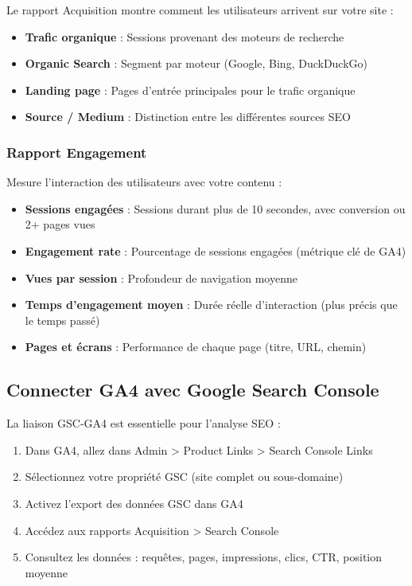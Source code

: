 \documentclass[12pt,a4paper,twoside]{report}
\begin{document}
Le rapport Acquisition montre comment les utilisateurs arrivent sur votre site :
\begin{itemize}
    \item \textbf{Trafic organique} : Sessions provenant des moteurs de recherche
    \item \textbf{Organic Search} : Segment par moteur (Google, Bing, DuckDuckGo)
    \item \textbf{Landing page} : Pages d'entrée principales pour le trafic organique
    \item \textbf{Source / Medium} : Distinction entre les différentes sources SEO
\end{itemize}

\subsubsection{Rapport Engagement}

Mesure l'interaction des utilisateurs avec votre contenu :
\begin{itemize}
    \item \textbf{Sessions engagées} : Sessions durant plus de 10 secondes, avec conversion ou 2+ pages vues
    \item \textbf{Engagement rate} : Pourcentage de sessions engagées (métrique clé de GA4)
    \item \textbf{Vues par session} : Profondeur de navigation moyenne
    \item \textbf{Temps d'engagement moyen} : Durée réelle d'interaction (plus précis que le temps passé)
    \item \textbf{Pages et écrans} : Performance de chaque page (titre, URL, chemin)
\end{itemize}

\subsection{Connecter GA4 avec Google Search Console}

La liaison GSC-GA4 est essentielle pour l'analyse SEO :

\begin{enumerate}
    \item Dans GA4, allez dans Admin > Product Links > Search Console Links
    \item Sélectionnez votre propriété GSC (site complet ou sous-domaine)
    \item Activez l'export des données GSC dans GA4
    \item Accédez aux rapports Acquisition > Search Console
    \item Consultez les données : requêtes, pages, impressions, clics, CTR, position moyenne
\end{enumerate}
\end{document}
